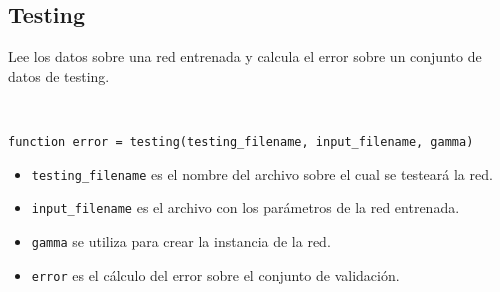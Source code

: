 \documentclass[informe.tex]{subfiles}
\begin{document}
    \subsection{Testing}
    
    Lee los datos sobre una red entrenada y calcula el error sobre un conjunto de datos de testing.
    
    ~
    
    \verb|function error = testing(testing_filename, input_filename, gamma)|
    
    \begin{itemize}
      \item \verb|testing_filename| es el nombre del archivo sobre el cual se testeará la red.
      
      \item \verb|input_filename| es el archivo con los parámetros de la red entrenada.
      
      \item \verb|gamma| se utiliza para crear la instancia de la red.
      
      \item \verb|error| es el cálculo del error sobre el conjunto de validación.
    \end{itemize}
    
\end{document}
